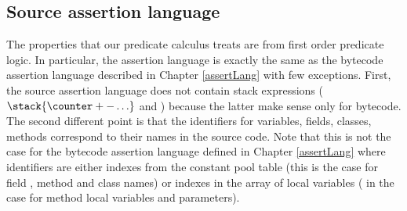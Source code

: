 
\subsection{Source assertion language} \label{formulasSrc}
The properties that our predicate calculus treats are from first order predicate logic.
In particular, the assertion language is exactly the same as the bytecode assertion language described 
in Chapter \ref{assertLang} with few exceptions. First, 
the source assertion language does not contain stack expressions ($\stack{\counter + - \ldots}$ and \counter)
because the latter make sense only for bytecode. The second different point  is that the
identifiers  for variables, fields, classes, methods correspond to their names in the source code. Note that this is not the case for the
bytecode assertion language defined in Chapter  \ref{assertLang} where identifiers are either indexes from the constant pool table (this is the case for field , method and class names)
or indexes in the array of local variables ( in the case for method local variables and parameters).

